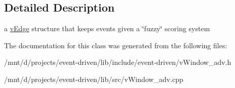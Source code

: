 \subsection{Detailed Description}
a \hyperlink{classev_1_1vEdge}{v\+Edge} structure that keeps events given a \char`\"{}fuzzy\char`\"{} scoring system 

The documentation for this class was generated from the following files\+:\begin{DoxyCompactItemize}
\item 
/mnt/d/projects/event-\/driven/lib/include/event-\/driven/v\+Window\+\_\+adv.\+h\item 
/mnt/d/projects/event-\/driven/lib/src/v\+Window\+\_\+adv.\+cpp\end{DoxyCompactItemize}
